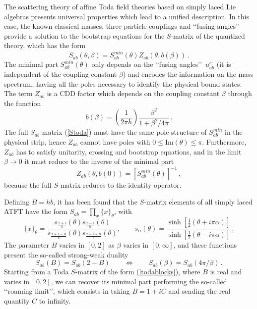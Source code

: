 \documentclass[a4paper,12pt]{report}
\begin{document}
The scattering theory of affine Toda field theories based on simply laced Lie algebras presents universal
properties which lead to a unified description. In this case, the known classical masses, three-particle
couplings and \lq\lq fusing angles\rq\rq\, provide a solution to the bootstrap equations for the $S$-matrix of
the quantized theory, which has the form
\begin{equation}\label{Stoda}
S_{ab}(\theta,\beta)=S_{ab}^{min}(\theta)Z_{ab}(\theta,b(\beta))\,.
\end{equation}
The minimal part $S_{ab}^{min}(\theta)$ only depends on the \lq\lq fusing angles\rq\rq\, $u_{ab}^{c}$ (it is
independent of the coupling constant $\beta$) and encodes the information on the mass spectrum, having all the
poles necessary to identify the physical bound states. The term $Z_{ab}$ is a CDD factor which depends on the
coupling constant $\beta$ through the function
\begin{equation}
b(\beta)=\left(\frac{1}{2\pi h}\right)\frac{\beta^{2}}{1+\beta^{2}/4\pi}\,.
\end{equation}
The full $S_{ab}$-matrix (\ref{Stoda}) must have the same pole structure of $S_{ab}^{min}$ in the physical strip,
hence $Z_{ab}$ cannot have poles with $0\leq\textrm{Im}(\theta)\leq\pi$. Furthermore, $Z_{ab}$ has to satisfy
unitarity, crossing and bootstrap equations, and in the limit $\beta\rightarrow 0$ it must reduce to the inverse
of the minimal part
\begin{equation}
Z_{ab}(\theta,b(0))=\left[S_{ab}^{min}(\theta)\right]^{-1}\,,
\end{equation}
because the full $S$-matrix reduces to the identity operator.

Defining $B=hb$, it has been found that the $S$-matrix elements of all simply laced ATFT have the form
$S_{ab}=\prod_{x}\{x\}_{\theta}$, with
\begin{equation}\label{todablocks}
\{x\}_{\theta}=\frac{s_{\frac{x+1}{h}}(\theta)s_{\frac{x-1}{h}}(\theta)}{s_{\frac{x+1-B}{h}}(\theta)s_{\frac{x-1+B}{h}}(\theta)}
, \qquad s_{\alpha}(\theta)=\frac{\sinh \left[\frac{1}{2}\left(\theta+i\pi \alpha\right)\right]}{\sinh
\left[\frac{1}{2}\left(\theta-i\pi\alpha\right)\right]}\,.
\end{equation}
The parameter $B$ varies in $[0,2]$ as $\beta$ varies in $[0,\infty]$, and these functions present the so-called
strong-weak duality
\begin{equation}
S_{ab}(B)=S_{ab}(2-B)\qquad\Longleftrightarrow\qquad  S_{ab}(\beta)=S_{ab}(4\pi/\beta)\,.
\end{equation}
Starting from a Toda $S$-matrix of the form (\ref{todablocks}), where $B$ is real and varies in $[0,2]$, we can
recover its minimal part performing the so-called \lq\lq roaming limit\rq\rq, which consists in taking $B=1+iC$
and sending the real quantity $C$ to infinity.
\end{document}
